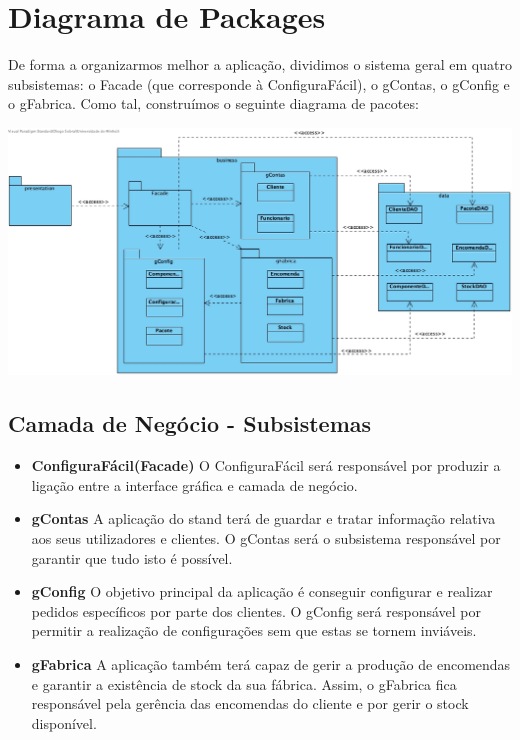 \section{Diagrama de Packages}
De forma a organizarmos melhor a aplicação, dividimos o sistema geral em quatro subsistemas: o Facade (que corresponde à ConfiguraFácil), o gContas, o gConfig e o gFabrica. Como tal, construímos o seguinte diagrama de pacotes:
\begin{center}
 	\includegraphics[width=6in]{VPP/Packages.jpg}
\end{center}
\newpage
\subsection{Camada de Negócio - Subsistemas}
\begin{itemize}
    \item \textbf{ConfiguraFácil(Facade)}\newline
    O ConfiguraFácil será responsável por produzir a ligação entre a interface gráfica e camada de negócio.
    \item \textbf{gContas} \newline
    A aplicação do stand terá de guardar e tratar informação relativa aos seus utilizadores e clientes. O gContas será o subsistema responsável por garantir que tudo isto é possível.
    \item \textbf{gConfig} \newline
    O objetivo principal da aplicação é conseguir configurar e realizar pedidos específicos por parte dos clientes. O gConfig será responsável por permitir a realização de configurações sem que estas se tornem inviáveis.
    \item \textbf{gFabrica} \newline
    A aplicação também terá capaz de gerir a produção de encomendas e garantir a existência de stock da sua fábrica. Assim, o gFabrica fica responsável pela gerência das encomendas do cliente e por gerir o stock disponível.
\end{itemize}
